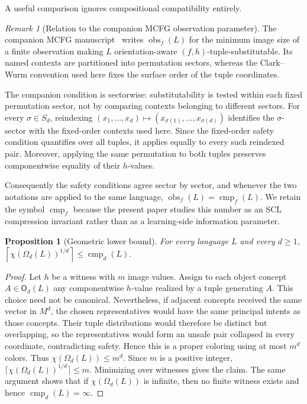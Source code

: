\documentclass[10pt,a4paper]{article}
\newtheorem{proposition}[theorem]{Proposition}
\theoremstyle{definition}
\theoremstyle{remark}
\newtheorem{remark}[theorem]{Remark}
\newcommand{\cmp}{\operatorname{cmp}}
\newcommand{\obs}{\operatorname{obs}}
\newcommand{\Obj}{\mathsf O}
\newcommand{\Om}{\Omega}
\begin{document}
A useful comparison ignores compositional compatibility entirely.

\begin{remark}[Relation to the companion MCFG observation parameter]
\label{rem:obs-cmp-reindex}
The companion MCFG manuscript~\cite{KuriyamaMCFG2026} writes
\(\obs_f(L)\) for the minimum image size of a finite observation making \(L\)
orientation-aware \((f,h)\)-tuple-substitutable.  Its named contexts are
partitioned into permutation sectors, whereas the Clark--Wurm convention
used here fixes the surface order of the tuple coordinates.

The companion condition is sectorwise: substitutability is tested within
each fixed permutation sector, not by comparing contexts belonging to
different sectors.  For every \(\sigma\in S_d\), reindexing
\((x_1,\ldots,x_d) \longmapsto (x_{\sigma(1)},\ldots,x_{\sigma(d)})\)
identifies the \(\sigma\)-sector with the fixed-order contexts used here.
Since the fixed-order safety condition quantifies over all tuples, it applies
equally to every such reindexed pair.  Moreover, applying the same
permutation to both tuples preserves componentwise equality of their
\(h\)-values.

Consequently the safety conditions agree sector by sector, and whenever the
two notations are applied to the same language,
\(\obs_f(L)=\cmp_f(L).\)
We retain the symbol \(\cmp_f\) because the present paper studies this number
as an SCL compression invariant rather than as a learning-side information
parameter.
\end{remark}

\begin{proposition}[Geometric lower bound]
\label{scl:prop:chromatic-lower}
For every language \(L\) and every \(d\ge1\),
\(
 \left\lceil\chi(\Om_d(L))^{1/d}\right\rceil\le \cmp_d(L).
\)
\end{proposition}
\begin{proof}
Let \(h\) be a witness with \(m\) image values.  Assign to each object concept
\(A\in\Obj_d(L)\) any componentwise \(h\)-value realized by a tuple generating
\(A\).  This choice need not be canonical.  Nevertheless, if adjacent concepts
received the same vector in \(M^d\), the chosen representatives would have the
same principal intents as those concepts.  Their tuple distributions would
therefore be distinct but overlapping, so the representatives would form an
unsafe pair collapsed in every coordinate, contradicting safety.  Hence this
is a proper coloring using at most \(m^d\) colors.  Thus \(\chi(\Om_d(L))\le m^d\).  Since \(m\) is a
positive integer, \(\lceil\chi(\Om_d(L))^{1/d}\rceil\le m\).  Minimizing
over witnesses gives the claim.  The same argument shows that if
\(\chi(\Om_d(L))\) is infinite, then no finite witness exists and hence
\(\cmp_d(L)=\infty\).
\end{proof}
\end{document}
